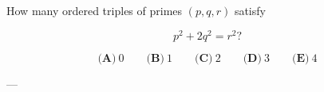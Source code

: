 How many ordered triples of primes \((p,q,r)\) satisfy



\[
p^2+2q^2=r^2?
\]

\[
\textbf{(A)}\ 0
\qquad
\textbf{(B)}\ 1
\qquad
\textbf{(C)}\ 2
\qquad
\textbf{(D)}\ 3
\qquad
\textbf{(E)}\ 4
\]

---
